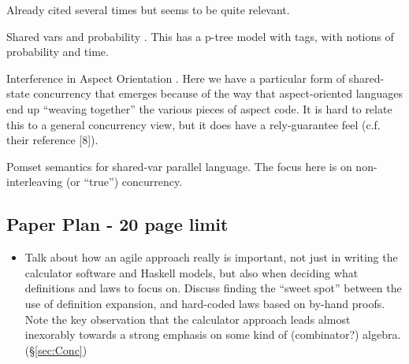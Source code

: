 Already cited several times but \cite{Gibbons:2014:FDS}
seems to be quite relevant.

Shared  vars and probability \cite{DBLP:conf/utp/ZhuSHQ12}.
This has a p-tree model with tags, with notions of probability and time.

Interference in Aspect Orientation \cite{DBLP:conf/utp/ChenYD10}.
Here we have a particular form of shared-state concurrency
that emerges because of the way that aspect-oriented languages
end up ``weaving together'' the various pieces of aspect code.
It is hard to relate this to a general concurrency view,
but it does have a rely-guarantee feel (c.f. their reference [8]).

Pomset semantics for shared-var parallel language\cite{DBLP:conf/utp/ZhaoWZ10}.
The focus here is on non-interleaving (or ``true'') concurrency.

\subsection*{Paper Plan - 20 page limit}

\begin{itemize}
  \item
    Talk about how an agile approach really is important,
    not just in writing the calculator software and Haskell models,
    but also when deciding what definitions and laws to focus on.
    Discuss finding the ``sweet spot'' between the use of definition
    expansion, and hard-coded laws based on by-hand proofs.
    Note the key observation that the calculator approach
    leads almost inexorably towards a strong emphasis
    on some kind of (combinator?) algebra. (\S\ref{sec:Conc})
\end{itemize}
